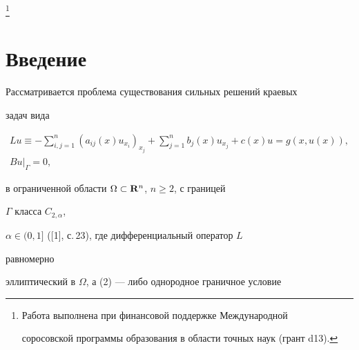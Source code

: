 \thanks{Работа выполнена при финансовой поддержке Международной 


соросовской программы образования в области точных наук (грант \No\;d13).} 


\date{} 




 


\pagestyle{plain} %


 


 




 


\maketitle 


\label{begin} 


 


 


\section*{Введение} 


 


Рассматривается проблема существования сильных решений краевых 


задач вида 


\begin{gather} 


Lu\equiv-\sum^n_{i,j=1}(a_{ij}(x)u_{x_i})_{x_j} 


+\sum^n_{j=1}b_j(x)u_{x_j}+c(x)u=g(x,u(x)),\\ 


Bu|_\Gamma=0, 


\end{gather} 


в ограниченной области $\Omega\subset\bold R^n$, $n\ge 2$, с границей 


$\Gamma$ класса $C_{2,\alpha}$, 


$\alpha\in(0,1]$ ([1], с.\,23), где дифференциальный оператор $L$ 


равномерно 


эллиптический в $\Omega$, а (2) --- либо однородное граничное условие 


